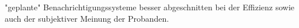 "geplante" Benachrichtigungssysteme besser abgeschnitten bei der Effizienz sowie auch der subjektiver Meinung der Probanden.










